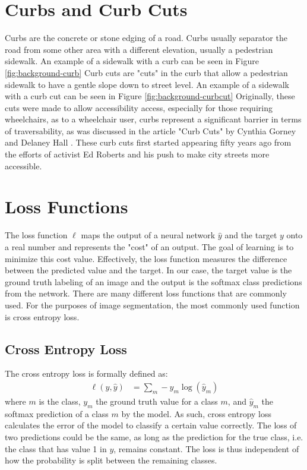 \section{Curbs and Curb Cuts}\label{section:background-curbs}
Curbs are the concrete or stone edging of a road. Curbs usually separator the road from some other area with a different elevation, usually a pedestrian sidewalk.
An example of a sidewalk with a curb can be seen in Figure \ref{fig:background-curb}
Curb cuts are "cuts" in the curb that allow a pedestrian sidewalk to have a gentle slope down to street level.
An example of a sidewalk with a curb cut can be seen in Figure \ref{fig:background-curbcut}
Originally, these cuts were made to allow accessibility access, especially for those requiring wheelchairs, as to a wheelchair user, curbs represent a significant barrier in terms of traversability, as was discussed in the article "Curb Cuts" by Cynthia Gorney and Delaney Hall \cite{99pi}. These curb cuts first started appearing fifty years ago from the efforts of activist Ed Roberts and his push to make city streets more accessible.



\section{Loss Functions}\label{section:background-loss}
The loss function $\ell$ maps the output of a neural network $\hat{y}$ and the target $y$ onto a real number and represents the "cost" of an output.
The goal of learning is to minimize this cost value.
Effectively, the loss function measures the difference between the predicted value and the target.
In our case, the target value is the ground truth labeling of an image and the output is the softmax class predictions from the network.
There are many different loss functions that are commonly used. For the purposes of image segmentation, the most commonly used function is cross entropy loss.

\subsection{Cross Entropy Loss}\label{section:background-crossentropy}
The cross entropy loss is formally defined as:
\begin{align}
	\ell(y, \hat{y}) &=\sum_{m}-y_m\log(\hat{y}_m)
\end{align}
where $m$ is the class, $y_m$ the ground truth value for a class $m$, and $\hat{y}_m$ the softmax prediction of a class $m$ by the model. 
As such, cross entropy loss calculates the error of the model to classify a certain value correctly.
The loss of two predictions could be the same, as long as the prediction for the true class, i.e. the class that has value 1 in $y$, remains constant.
The loss is thus independent of how the probability is split between the remaining classes.

